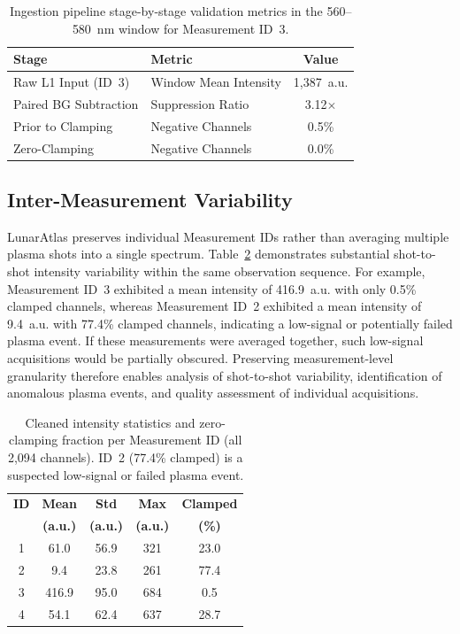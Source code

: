 \documentclass[final,5p,twocolumn,a4paper]{elsarticle}
\begin{document}
\begin{table}[!htbp]
\centering
\footnotesize
\setlength{\tabcolsep}{4pt}
\begin{tabular}{@{}p{2.8cm}p{2.8cm}c@{}}
\toprule
\textbf{Stage} & \textbf{Metric} & \textbf{Value} \\
\midrule
Raw L1 Input (ID~3) & Window Mean Intensity & 1,387~a.u. \\
Paired BG Subtraction & Suppression Ratio & 3.12$\times$ \\
Prior to Clamping & Negative Channels & 0.5\% \\
Zero-Clamping & Negative Channels & 0.0\% \\
\bottomrule
\end{tabular}
\caption{Ingestion pipeline stage-by-stage validation metrics in the 560--580~nm window for Measurement ID~3.}
\label{table:ablation}
\end{table}


\subsection{Inter-Measurement Variability}

LunarAtlas preserves individual Measurement IDs rather than averaging multiple plasma shots into a single spectrum. Table~\ref{table:variability} demonstrates substantial shot-to-shot intensity variability within the same observation sequence. For example, Measurement ID~3 exhibited a mean intensity of 416.9~a.u. with only 0.5\% clamped channels, whereas Measurement ID~2 exhibited a mean intensity of 9.4~a.u. with 77.4\% clamped channels, indicating a low-signal or potentially failed plasma event. If these measurements were averaged together, such low-signal acquisitions would be partially obscured. Preserving measurement-level granularity therefore enables analysis of shot-to-shot variability, identification of anomalous plasma events, and quality assessment of individual acquisitions.

\begin{table}[!htbp]
\centering
\footnotesize
\setlength{\tabcolsep}{4pt}
\begin{tabular}{@{}ccccc@{}}
\toprule
\textbf{ID} & \textbf{Mean} & \textbf{Std} & \textbf{Max} & \textbf{Clamped} \\
 & \textbf{(a.u.)} & \textbf{(a.u.)} & \textbf{(a.u.)} & \textbf{(\%)} \\
\midrule
1 & 61.0  & 56.9 & 321 & 23.0 \\
2 & 9.4   & 23.8 & 261 & 77.4 \\
3 & 416.9 & 95.0 & 684 & 0.5  \\
4 & 54.1  & 62.4 & 637 & 28.7 \\
\bottomrule
\end{tabular}
\caption{Cleaned intensity statistics and zero-clamping fraction per Measurement ID (all 2,094 channels). ID~2 (77.4\% clamped) is a suspected low-signal or failed plasma event.}
\label{table:variability}
\end{table}
\end{document}

